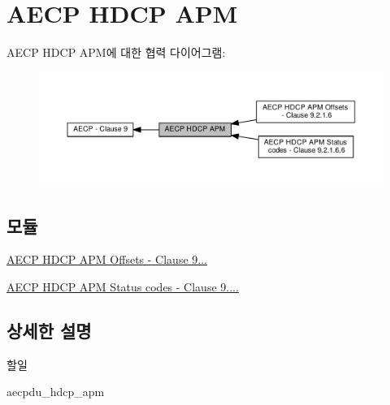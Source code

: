 \hypertarget{group__aecpdu__hdcp__apm}{}\section{A\+E\+CP H\+D\+CP A\+PM}
\label{group__aecpdu__hdcp__apm}
A\+E\+CP H\+D\+CP A\+P\+M에 대한 협력 다이어그램\+:
\nopagebreak
\begin{figure}[H]
\begin{center}
\leavevmode
\includegraphics[width=350pt]{group__aecpdu__hdcp__apm}
\end{center}
\end{figure}
\subsection*{모듈}
\begin{DoxyCompactItemize}
\item 
\hyperlink{group__aecpdu__hdcp__apm__offsets}{A\+E\+C\+P H\+D\+C\+P A\+P\+M Offsets -\/ Clause 9...}
\item 
\hyperlink{group__aecpdu__hdcp__apm__status}{A\+E\+C\+P H\+D\+C\+P A\+P\+M Status codes -\/ Clause 9....}
\end{DoxyCompactItemize}


\subsection{상세한 설명}
\begin{DoxyRefDesc}{할일}
\item[\hyperlink{todo__todo000003}{할일}]aecpdu\+\_\+hdcp\+\_\+apm \end{DoxyRefDesc}
